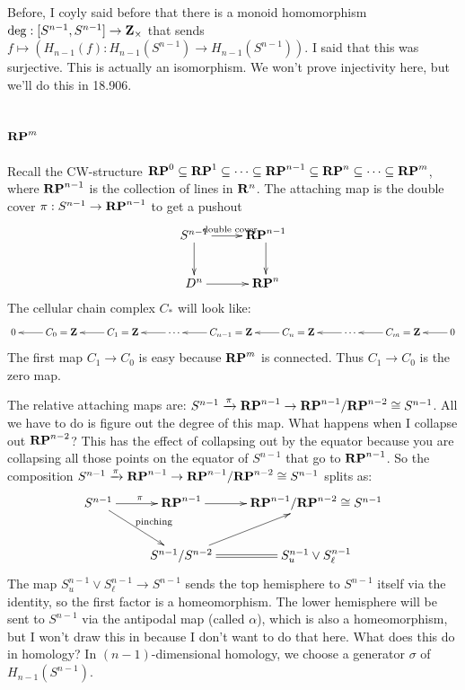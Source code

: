 Before, I coyly said before that there is a monoid homomorphism $\deg:[S^{n-1},S^{n-1}]\to\mathbf Z_\times$ that sends $f\mapsto ( H_{n-1}(f): H_{n-1}(S^{n-1})\to H_{n-1}(S^{n-1}))$. I said that this was surjective. This is actually an isomorphism. We won't prove injectivity here, but we'll do this in 18.906.
\subsection{$\mathbf{RP}^m$}
Recall the CW-structure $\mathbf{RP}^0\subseteq\mathbf{RP}^1\subseteq\cdots\subseteq\mathbf{RP}^{n-1}\subseteq\mathbf{RP}^n\subseteq \cdots\subseteq\mathbf{RP}^m$, where $\mathbf{RP}^{n-1}$ is the collection of lines in $\mathbf R^n$. The attaching map is the double cover $\pi:S^{n-1}\to\mathbf{RP}^{n-1}$ to get a pushout
\begin{equation*}
\xymatrix{S^{n-1}\ar[r]^{\text{double cover}}\ar[d] & \RP^{n-1}\ar[d]\\
D^n\ar[r] & \RP^n}
\end{equation*}
The cellular chain complex $C_\ast$ will look like:
\begin{equation*}
\xymatrix{0 & C_0=\Z\ar[l] & C_1=\Z\ar[l] & \cdots\ar[l] & C_{n-1}=\Z\ar[l] & C_n=\Z\ar[l] & \cdots\ar[l] & C_m=\Z\ar[l] & 0\ar[l]}
\end{equation*}
The first map $C_1\to C_0$ is easy because $\mathbf{RP}^m$ is connected. Thus $C_1\to C_0$ is the zero map.

The relative attaching maps are: $S^{n-1}\xrightarrow{\pi}\mathbf{RP}^{n-1}\to \mathbf{RP}^{n-1}/\mathbf{RP}^{n-2}\cong S^{n-1}$. All we have to do is figure out the degree of this map. What happens when I collapse out $\mathbf{RP}^{n-2}$? This has the effect of collapsing out by the equator because you are collapsing all those points on the equator of $S^{n-1}$ that go to $\mathbf{RP}^{n-1}$. So the composition $S^{n-1}\xrightarrow{\pi}\mathbf{RP}^{n-1}\to \mathbf{RP}^{n-1}/\mathbf{RP}^{n-2}\cong S^{n-1}$ splits as:
\begin{equation*}
\xymatrix{S^{n-1}\ar[r]^{\pi}\ar[dr]^{\text{pinching}} & \mathbf{RP}^{n-1}\ar[r] & \RP^{n-1}/\RP^{n-2}\cong S^{n-1}\\
 & S^{n-1}/S^{n-2}\ar[ur]\ar@{=}[r] & S^{n-1}_u\vee S^{n-1}_\ell}
\end{equation*}
The map $S^{n-1}_u\vee S^{n-1}_\ell\to S^{n-1}$ sends the top hemisphere to $S^{n-1}$ itself via the identity, so the first factor is a homeomorphism. The lower hemisphere will be sent to $S^{n-1}$ via the antipodal map (called $\alpha$), which is also a homeomorphism, but I won't draw this in because I don't want to do that here. What does this do in homology? In $(n-1)$-dimensional homology, we choose a generator $\sigma$ of $ H_{n-1}(S^{n-1})$.

